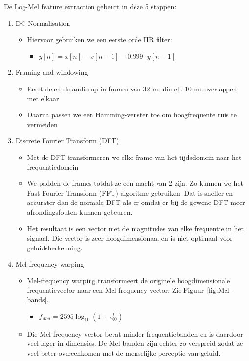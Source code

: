 \begin{no-awa} %
De  Log-Mel feature extraction gebeurt in deze 5 stappen:

\begin{enumerate}
	\item DC-Normalisation
	      \begin{itemize}
		      \item Hiervoor gebruiken we een eerste orde IIR filter:
		            \begin{itemize}[label={}]
			            \item \(y\left[ n \right] = x\left[ n \right] - x\left[ n - 1 \right] -0.999 \cdot y\left[ n - 1 \right]\)
		            \end{itemize}
	      \end{itemize}

	\item Framing and windowing
	      \begin{itemize}
		      \item Eerst delen de audio op in frames van 32 ms die elk 10 ms overlappen met elkaar
		      \item Daarna passen we een Hamming-venster toe om hoogfrequente ruis te vermeiden \cite{enwiki:windowing}
	      \end{itemize}

	\item Discrete Fourier Transform (DFT)
	      \begin{itemize}
		      \item Met de DFT transformeren we elke frame van het tijdsdomein naar het frequentiedomein
		      \item We padden de frames totdat ze een macht van 2 zijn. Zo kunnen we het Fast Fourier Transform (FFT) algoritme gebruiken. Dat is sneller en accurater dan de normale DFT als er omdat er bij de gewone DFT meer afrondingsfouten kunnen gebeuren. \cite{enwiki:FFT}
		      \item Het resultaat is een vector met de magnitudes van elke frequentie in het signaal. Die vector is zeer hoogdimensionaal en is niet optimaal voor geluidsherkenning.
	      \end{itemize}

	\item Mel-frequency warping
	      \begin{itemize}
		      \item Mel-frequency warping transformeert de originele hoogdimensionale frequentievector naar een Mel-frequency vector. Zie Figuur~\ref{fig:Mel-bands}.
		            \begin{itemize}[label={}]
			            \item \(f_{Mel} = 2595\log_{10}(1 + \frac{f}{700})\)
		            \end{itemize}
		      \item Die Mel-frequency vector bevat minder frequentiebanden en is daardoor veel lager in dimensies. De Mel-banden zijn echter zo verspreid zodat ze veel beter overeenkomen met de menselijke perceptie van geluid.
	      \end{itemize}


\end{enumerate}
\end{no-awa}

